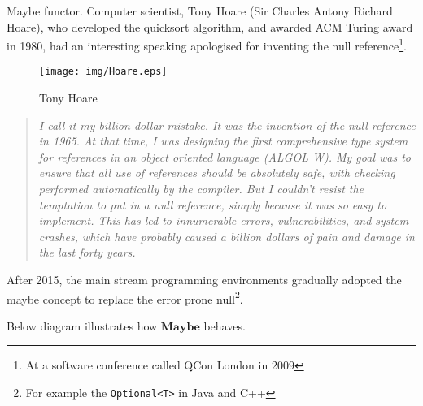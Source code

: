 \documentclass{article}
\begin{document}
\begin{example}
\normalfont
{}
Maybe functor. Computer scientist, Tony Hoare (Sir Charles Antony Richard Hoare), who developed the quicksort algorithm, and awarded ACM Turing award in 1980, had an interesting speaking apologised for inventing the null reference\footnote{At a software conference called QCon London in 2009}.

\begin{figure}[htbp]
 \centering
 \texttt{[image: img/Hoare.eps]}
 \captionsetup{labelformat=empty}
 \caption{Tony Hoare}
 \label{fig:Hoare}
\end{figure}

\begin{quotation}
\itshape
I call it my billion-dollar mistake. It was the invention of the null reference in 1965. At that time, I was designing the first comprehensive type system for references in an object oriented language (ALGOL W). My goal was to ensure that all use of references should be absolutely safe, with checking performed automatically by the compiler. But I couldn't resist the temptation to put in a null reference, simply because it was so easy to implement. This has led to innumerable errors, vulnerabilities, and system crashes, which have probably caused a billion dollars of pain and damage in the last forty years\cite{Wiki-Hoare}.
\end{quotation}

After 2015, the main stream programming environments gradually adopted the maybe concept to replace the error prone null\footnote{For example the \texttt{Optional<T>} in Java and C++}.

Below diagram illustrates how $\mathbf{Maybe}$ behaves.

\begin{center}
\end{center}


\end{example}
\end{document}
